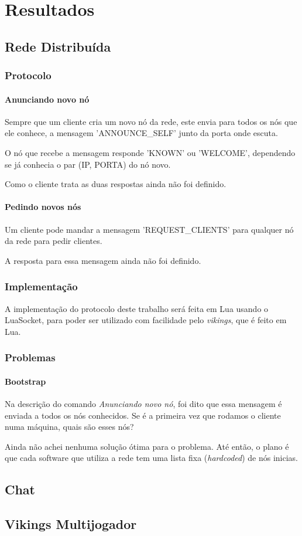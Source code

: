 \chapter{Resultados}
\label{sec:resultados}

\section{Rede Distribuída}
\label{sec:resultados:rede}

  \subsection{Protocolo}
    \subsubsection{Anunciando novo nó}
      Sempre que um cliente cria um novo nó da rede, este envia para todos os nós que ele conhece, 
      a mensagem 'ANNOUNCE\_SELF' junto da porta onde escuta.
      
      O nó que recebe a mensagem responde 'KNOWN' ou 'WELCOME', dependendo se já conhecia o par
      (IP, PORTA) do nó novo.
      
      Como o cliente trata as duas respostas ainda não foi definido.
      
    \subsubsection{Pedindo novos nós}
      Um cliente pode mandar a mensagem 'REQUEST\_CLIENTS' para qualquer nó da rede para pedir clientes.
      
      A resposta para essa mensagem ainda não foi definido.
      
  \subsection{Implementação}
    A implementação do protocolo deste trabalho será feita em Lua usando o LuaSocket, %
    para poder ser utilizado com facilidade pelo \textit{vikings}, que é feito em Lua.
  
  \subsection{Problemas}
    \subsubsection{Bootstrap}
      Na descrição do comando \textit{Anunciando novo nó}, foi dito que essa mensagem é enviada a todos
      os nós conhecidos. Se é a primeira vez que rodamos o cliente numa máquina, quais são esses nós?
      
      Ainda não achei nenhuma solução ótima para o problema. Até então, o plano é que cada software
      que utiliza a rede tem uma lista fixa (\textit{hardcoded}) de nós inicias.
\section{Chat}
\label{sec:resultados:chat}

\section{Vikings Multijogador}
\label{sec:resultados:vikings}
